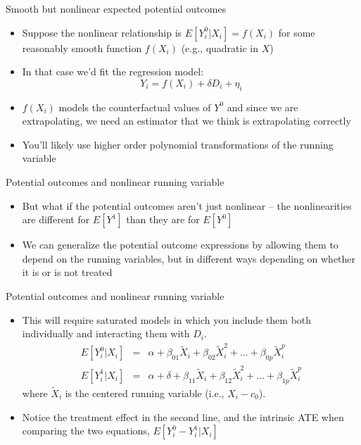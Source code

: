 \documentclass{beamer}
\begin{document}
\begin{frame}{Smooth but nonlinear expected potential outcomes}
	
	\begin{itemize}
	\item Suppose the nonlinear relationship is $E[Y_i^0 | X_i]=f(X_i)$ for some reasonably smooth function $f(X_i)$ (e.g., quadratic in $X$) 
	\item In that case we'd fit the regression model:$$Y_i=f(X_i) + \delta{D_i} + \eta_i$$
	\item $f(X_i)$ models the counterfactual values of $Y^0$ and since we are extrapolating, we need an estimator that we think is extrapolating correctly
	\item You'll likely use higher order polynomial transformations of the running variable 
	\end{itemize}
\end{frame}








\begin{frame}{Potential outcomes and nonlinear running variable}
	
	\begin{itemize}
	\item But what if the potential outcomes aren't just nonlinear -- the nonlinearities are different for $E[Y^1]$ than they are for $E[Y^0]$
	\item We can generalize the potential outcome expressions by allowing them to depend on the running variables, but in different ways depending on whether it is or is not treated
	\end{itemize}
\end{frame}


\begin{frame}{Potential outcomes and nonlinear running variable}
	
	\begin{itemize}
	\item This will require saturated models in which you include them both individually and interacting them with $D_i$.  
		\begin{eqnarray*}
		E[Y_i^0 | X_i] &=& \alpha + \beta_{01}\tilde{X}_i + \beta_{02}\tilde{X}_i^2 + \dots + \beta_{0p}\tilde{X}_i^p \\
		E[Y_i^1 | X_i] &=& \alpha + \delta + \beta_{11}\tilde{X}_i + \beta_{12}\tilde{X}_i^2 + \dots + \beta_{1p}\tilde{X}_i^p
		\end{eqnarray*}where $\tilde{X}_i$ is the centered running variable (i.e., $X_i - c_0$). 
	\item Notice the treatment effect in the second line, and the intrinsic ATE when comparing the two equations, $E[Y_i^0 - Y_i^1 | X_i]$	
	\end{itemize}
\end{frame}
\end{document}
